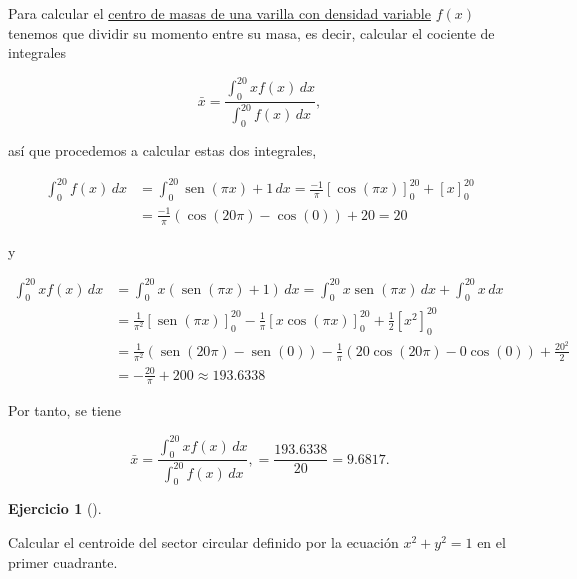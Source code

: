 \documentclass[
  spanish,
  a4paper,
]{scrreport}
\theoremstyle{definition}
\newtheorem{exercise}{Ejercicio}[chapter]
\theoremstyle{remark}
\begin{document}
\begin{tcolorbox}[enhanced jigsaw, arc=.35mm, bottomrule=.15mm, bottomtitle=1mm, breakable, colback=white, colbacktitle=quarto-callout-tip-color!10!white, colframe=quarto-callout-tip-color-frame, coltitle=black, left=2mm, leftrule=.75mm, opacityback=0, opacitybacktitle=0.6, rightrule=.15mm, title=\textcolor{quarto-callout-tip-color}{\faLightbulb}\hspace{0.5em}{Solución}, titlerule=0mm, toprule=.15mm, toptitle=1mm]

Para calcular el
\href{https://aprendeconalf.es/analisis-manual/08-integrales.html\#centro-de-masas-de-una-varilla-con-densidad-variable}{centro
de masas de una varilla con densidad variable} \(f(x)\) tenemos que
dividir su momento entre su masa, es decir, calcular el cociente de
integrales

\[
\bar x = \frac{\int_0^{20} x f(x)\,dx}{\int_0^{20}f(x)\,dx}, 
\]

así que procedemos a calcular estas dos integrales,

\begin{align*}
\int_0^{20} f(x)\,dx 
&= \int_0^{20} \operatorname{sen}(\pi x)+1 \,dx
= \frac{-1}{\pi}[\cos(\pi x)]_0^{20} + [x]_0^{20}\\
&= \frac{-1}{\pi}(\cos(20\pi)-\cos(0)) + 20
= 20
\end{align*}

y

\begin{align*}
\int_0^{20} xf(x)\,dx 
&= \int_0^{20} x(\operatorname{sen}(\pi x)+1) \,dx
= \int_0^{20} x\operatorname{sen}(\pi x)\,dx + \int_0^{20}x \,dx \\
&= \frac{1}{\pi^2}[\operatorname{sen}(\pi x)]_0^{20}-\frac{1}{\pi}[x\cos(\pi x)]_0^{20} + \frac{1}{2}[x^2]_0^{20} \tag{partes} \\
&= \frac{1}{\pi^2}(\operatorname{sen}(20\pi)-\operatorname{sen}(0)) -\frac{1}{\pi}(20\cos(20\pi)-0\cos(0)) + \frac{20^2}{2} \\
&= -\frac{20}{\pi}+200
\approx 193.6338
\end{align*}

Por tanto, se tiene

\[
\bar x = \frac{\int_0^{20} x f(x)\,dx}{\int_0^{20}f(x)\,dx},
= \frac{193.6338}{20}
= 9.6817.
\]

\end{tcolorbox}

\begin{exercise}[]\protect\hypertarget{exr-centro-masas-3}{}\label{exr-centro-masas-3}

Calcular el centroide del sector circular definido por la ecuación
\(x^2+y^2=1\) en el primer cuadrante.

\end{exercise}
\end{document}
